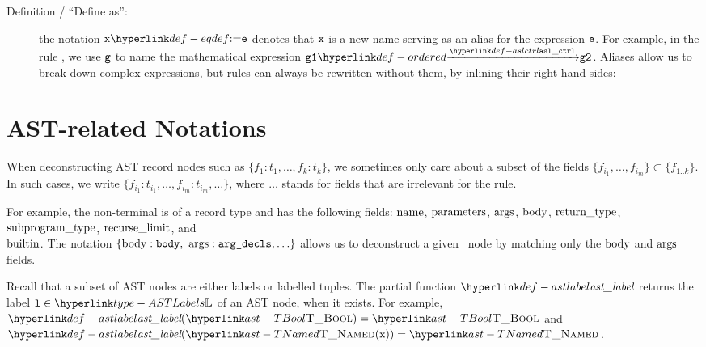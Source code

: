 \begin{description}
\hypertarget{def-eqdef}{}
\item[Definition / ``Define as'':] the notation $\vx \eqdef \ve$ denotes that $\vx$ is a new name serving as an alias for the expression $\ve$.
For example, in the rule , we use $\vg$ to name the mathematical expression
$\ordered{\vgone}{\aslctrl}{\vgtwo}$.
Aliases allow us to break down complex expressions, but rules can always be rewritten without them,
by inlining their right-hand sides:
\begin{mathpar}
\end{mathpar}
\end{description}

\section{AST-related Notations\label{sec:ASTNotations}}

When deconstructing AST record nodes such as $\{f_1:t_1,\ldots,f_k:t_k\}$,
we sometimes only care about a subset of the fields $\{f_{i_1},\ldots,f_{i_m}\} \subset \{f_{1..k}\}$.
In such cases, we write $\{f_{i_1}:t_{i_1},\ldots,f_{i_m}:t_{i_m},\ldots\}$,
where $\ldots$ stands for fields that are irrelevant for the rule.

For example, the \func{} non-terminal is
of a record type and has the following fields:
$\funcname$, $\funcparameters$, $\funcargs$, $\funcbody$, $\funcreturntype$, $\funcsubprogramtype$,
$\funcrecurselimit$, and \\
$\funcbuiltin$.
The notation $\{ \funcbody:\vbody,\ \funcargs:\vargdecls, \ldots \}$
allows us to deconstruct a given \func\ node by matching only the $\funcbody$ and $\funcargs$ fields.

Recall that a subset of AST nodes are either labels or labelled tuples.
\hypertarget{def-astlabel}{}
The partial function $\astlabel$ returns the label $\vl\in\ASTLabels$ of an AST node, when it exists.
For example, $\astlabel(\TBool) = \TBool$ and $\astlabel(\TNamed(\vx)) = \TNamed$.

